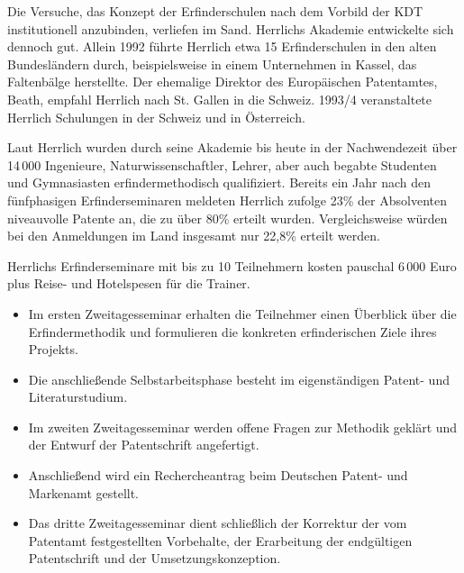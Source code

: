 \documentclass[11pt,a4paper]{article}
\begin{document}
Die Versuche, das Konzept der Erfinderschulen nach dem Vorbild der KDT
institutionell anzubinden, verliefen im Sand. Herrlichs Akademie entwickelte
sich dennoch gut. Allein 1992 führte Herrlich etwa 15 Erfinderschulen in den
alten Bundesländern durch, beispielsweise in einem Unternehmen in Kassel, das
Faltenbälge herstellte. Der ehemalige Direktor des Europäischen Patentamtes,
Beath, empfahl Herrlich nach St. Gallen in die Schweiz. 1993/4 veranstaltete
Herrlich Schulungen in der Schweiz und in Österreich.

Laut Herrlich wurden durch seine Akademie bis heute in der Nachwendezeit über
14\,000 Ingenieure, Naturwissenschaftler, Lehrer, aber auch begabte Studenten
und Gymnasiasten erfindermethodisch qualifiziert. Bereits ein Jahr nach den
fünfphasigen Erfinderseminaren meldeten Herrlich zufolge 23\% der Absolventen
niveauvolle Patente an, die zu über 80\% erteilt wurden. Vergleichsweise
würden bei den Anmeldungen im Land insgesamt nur 22,8\% erteilt
werden.

Herrlichs Erfinderseminare mit bis zu 10 Teilnehmern kosten pauschal 6\,000
Euro plus Reise- und Hotelspesen für die Trainer.
\begin{itemize}\itemsep0pt
\item 
Im ersten Zweitagesseminar erhalten die Teilnehmer einen Überblick über die
Erfindermethodik und formulieren die konkreten erfinderischen Ziele ihres
Projekts.
\item 
Die anschließende Selbstarbeitsphase besteht im eigenständigen Patent- und
Literaturstudium.
\item 
Im zweiten Zweitagesseminar werden offene Fragen zur Methodik geklärt und der
Entwurf der Patentschrift angefertigt.
\item 
Anschließend wird ein Rechercheantrag beim Deutschen Patent- und Markenamt
gestellt.
\item 
Das dritte Zweitagesseminar dient schließlich der Korrektur der vom Patentamt
festgestellten Vorbehalte, der Erarbeitung der endgültigen Patentschrift und
der Umsetzungskonzeption.
\end{itemize}


\ccnotice
\end{document}
